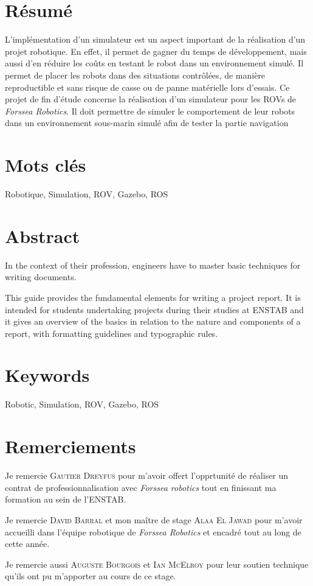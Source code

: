 \section*{Résumé}
	L'implémentation d'un simulateur est un aspect important de la réalisation d'un projet robotique. En effet, il permet de gagner du temps de développement, mais aussi d'en réduire les coûts en testant le robot dans un environnement simulé. Il permet de placer les robots dans des situations contrôlées, de manière reproductible et sans risque de casse ou de panne matérielle lors d'essais.
	Ce projet de fin d'étude concerne la réalisation d'un simulateur pour les \gls{ROV}s de \textit{Forssea Robotics}. Il doit permettre de simuler le comportement de leur robots dans un environnement sous-marin simulé afin de tester la partie navigation 

\section*{Mots clés}
Robotique, Simulation, ROV, Gazebo, ROS

\section*{Abstract}
	In the context of their profession, engineers have to master basic
	techniques for writing documents.
	
	This guide provides the fundamental elements for writing a project
	report. It is intended for students undertaking projects during their
	studies at \gls{ENSTAB} and it gives an overview of the basics in
	relation to the nature and components of a report, with formatting
	guidelines and typographic rules.
	
\section*{Keywords}
Robotic, Simulation, ROV, Gazebo, ROS


\section*{Remerciements}

Je remercie \textsc{Gautier Dreyfus} pour m'avoir offert l'opprtunité de réaliser un contrat de professionnalisation avec \textit{Forssea robotics} tout en finissant ma formation au sein de l'\gls{ENSTAB}.

Je remercie \textsc{David Barral} et mon maître de stage \textsc{Alaa El Jawad} pour m'avoir accueilli dans l'équipe robotique de \textit{Forssea Robotics} et encadré tout au long de cette année.

Je remercie aussi \textsc{Auguste Bourgois} et \textsc{Ian McElroy} pour leur soutien technique qu'ils ont pu m'apporter au cours de ce stage.